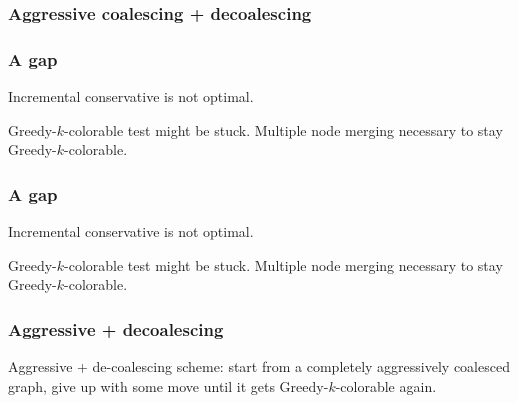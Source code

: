 \subsubsection*{Aggressive coalescing + decoalescing}

\begin{frame}[label=past]
  \frametitle{A gap}
  Incremental conservative is not optimal. 
  \begin{block}{}
  Greedy-$k$-colorable test might be stuck. Multiple node merging necessary to stay Greedy-$k$-colorable.
\end{block}
%

\end{frame}
%
\begin{frame}[label=past]
  \frametitle{A gap}
  Incremental conservative is not optimal. 
  \begin{block}{}
  Greedy-$k$-colorable test might be stuck. Multiple node merging necessary to stay Greedy-$k$-colorable.
\end{block}
{\vspace{2.5cm}}%
\end{frame}
%
\begin{frame}[label=past]
  \frametitle{Aggressive + decoalescing}
\begin{block}{}
\alert{Aggressive + de-coalescing} scheme: start from a completely aggressively coalesced graph, give up with some move until it gets Greedy-$k$-colorable again. 
\end{block}
  \vspace{2.5cm}
\end{frame}


